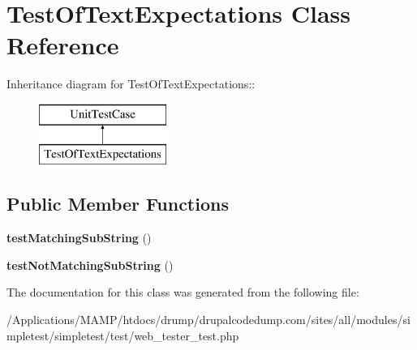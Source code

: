 \hypertarget{class_test_of_text_expectations}{
\section{TestOfTextExpectations Class Reference}
\label{class_test_of_text_expectations}
}
Inheritance diagram for TestOfTextExpectations::\begin{figure}[H]
\begin{center}
\leavevmode
\includegraphics[height=2cm]{class_test_of_text_expectations}
\end{center}
\end{figure}
\subsection*{Public Member Functions}
\begin{DoxyCompactItemize}
\item 
\hypertarget{class_test_of_text_expectations_aa1ac51aeb4aa4698da0d814ba066372b}{
{\bfseries testMatchingSubString} ()}
\label{class_test_of_text_expectations_aa1ac51aeb4aa4698da0d814ba066372b}

\item 
\hypertarget{class_test_of_text_expectations_abbd94c2769caeb851a306f48226a3a2f}{
{\bfseries testNotMatchingSubString} ()}
\label{class_test_of_text_expectations_abbd94c2769caeb851a306f48226a3a2f}

\end{DoxyCompactItemize}


The documentation for this class was generated from the following file:\begin{DoxyCompactItemize}
\item 
/Applications/MAMP/htdocs/drump/drupalcodedump.com/sites/all/modules/simpletest/simpletest/test/web\_\-tester\_\-test.php\end{DoxyCompactItemize}
